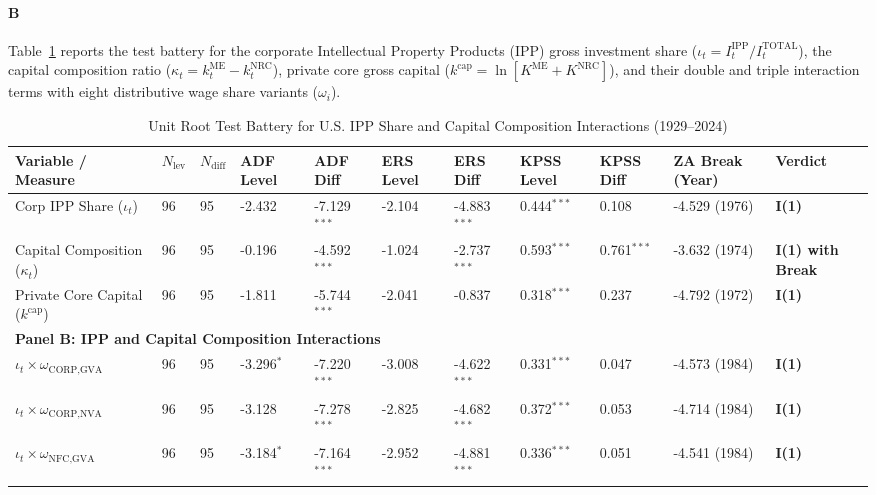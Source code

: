 \paragraph{B}
Table~\ref{tab:urca_results_ipp} reports the test battery for the corporate Intellectual Property Products (IPP) gross investment share ($\iota_t = I^{\text{IPP}}_t / I^{\text{TOTAL}}_t$), the capital composition ratio ($\kappa_t = k^{\text{ME}}_t - k^{\text{NRC}}_t$), private core gross capital ($k^{\text{cap}} = \ln[K^{\text{ME}} + K^{\text{NRC}}]$), and their double and triple interaction terms with eight distributive wage share variants ($\omega_i$).

\begin{landscape}
\begin{table}[h!]
\centering
\footnotesize
\setlength{\tabcolsep}{3pt}
\caption{Unit Root Test Battery for U.S. IPP Share and Capital Composition Interactions (1929--2024)}
\label{tab:urca_results_ipp}
\begin{tabular}{p{5.8cm} p{0.6cm} p{0.6cm} p{1.4cm} p{1.4cm} p{1.4cm} p{1.4cm} p{1.4cm} p{1.4cm} p{2.2cm} p{2.2cm}}
\toprule
\textbf{Variable / Measure} & \textbf{$N_{\text{lev}}$} & \textbf{$N_{\text{diff}}$} & \textbf{ADF Level} & \textbf{ADF Diff} & \textbf{ERS Level} & \textbf{ERS Diff} & \textbf{KPSS Level} & \textbf{KPSS Diff} & \textbf{ZA Break (Year)} & \textbf{Verdict} \\
\midrule
Corp IPP Share ($\iota_t$) & 96 & 95 & -2.432 & -7.129$^{***}$ & -2.104 & -4.883$^{***}$ & 0.444$^{***}$ & 0.108 & -4.529 (1976) & \textbf{I(1)} \\
Capital Composition ($\kappa_t$) & 96 & 95 & -0.196 & -4.592$^{***}$ & -1.024 & -2.737$^{***}$ & 0.593$^{***}$ & 0.761$^{***}$ & -3.632 (1974) & \textbf{I(1) with Break} \\
Private Core Capital ($k^{\text{cap}}$) & 96 & 95 & -1.811 & -5.744$^{***}$ & -2.041 & -0.837 & 0.318$^{***}$ & 0.237 & -4.792 (1972) & \textbf{I(1)} \\
\midrule
\multicolumn{11}{l}{\textbf{Panel B: IPP and Capital Composition Interactions}} \\
\midrule
$\iota_t \times \omega_{\text{CORP,GVA}}$ & 96 & 95 & -3.296$^{*}$ & -7.220$^{***}$ & -3.008 & -4.622$^{***}$ & 0.331$^{***}$ & 0.047 & -4.573 (1984) & \textbf{I(1)} \\
$\iota_t \times \omega_{\text{CORP,NVA}}$ & 96 & 95 & -3.128 & -7.278$^{***}$ & -2.825 & -4.682$^{***}$ & 0.372$^{***}$ & 0.053 & -4.714 (1984) & \textbf{I(1)} \\
$\iota_t \times \omega_{\text{NFC,GVA}}$ & 96 & 95 & -3.184$^{*}$ & -7.164$^{***}$ & -2.952 & -4.881$^{***}$ & 0.336$^{***}$ & 0.051 & -4.541 (1984) & \textbf{I(1)} \\

\end{tabular}
\end{table}
\end{landscape}

